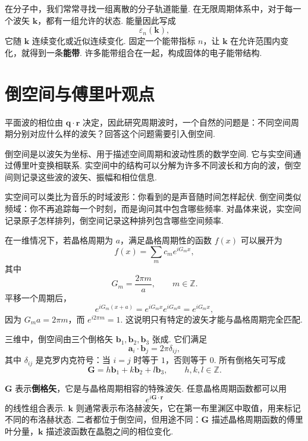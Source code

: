 \documentclass[UTF8,11pt,a4paper,openany]{ctexbook}
\newcommand{\term}[1]{\textbf{#1}}
\begin{document}
在分子中，我们常常寻找一组离散的分子轨道能量. 在无限周期体系中，对于每一个波矢 $\mathbf k$，都有一组允许的状态. 能量因此写成
\[
\varepsilon_n(\mathbf k),
\]
它随 $\mathbf k$ 连续变化或近似连续变化. 固定一个能带指标 $n$，让 $\mathbf k$ 在允许范围内变化，就得到一条\term{能带}. 许多能带组合在一起，构成固体的电子能带结构. 

\section{倒空间与傅里叶观点}

平面波的相位由 $\mathbf q\cdot\mathbf r$ 决定，因此研究周期波时，一个自然的问题是：不同空间周期分别对应什么样的波矢？回答这个问题需要引入倒空间. 

\begin{definitionbox}
倒空间是以波矢为坐标、用于描述空间周期和波动性质的数学空间. 它与实空间通过傅里叶变换相联系. 实空间中的结构可以分解为许多不同波长和方向的波，倒空间则记录这些波的波矢、振幅和相位信息. 
\end{definitionbox}

\begin{analogybox}
实空间可以类比为音乐的时域波形：你看到的是声音随时间怎样起伏. 倒空间类似频域：你不再追踪每一个时刻，而是询问其中包含哪些频率. 对晶体来说，实空间记录原子怎样排列，倒空间记录这种排列包含哪些空间频率. 
\end{analogybox}

在一维情况下，若晶格周期为 $a$，满足晶格周期性的函数 $f(x)$ 可以展开为
\[
f(x)=\sum_m c_m e^{iG_m x},
\]
其中
\[
G_m=\frac{2\pi m}{a},\qquad m\in\mathbb Z.
\]
平移一个周期后，
\[
e^{iG_m(x+a)}
=
e^{iG_mx}e^{iG_ma}
=
e^{iG_mx},
\]
因为 $G_ma=2\pi m$，而 $e^{i2\pi m}=1$. 这说明只有特定的波矢才能与晶格周期完全匹配. 

三维中，倒空间由三个倒格矢 $\mathbf b_1,\mathbf b_2,\mathbf b_3$ 张成. 它们满足
\[
\mathbf a_i\cdot\mathbf b_j=2\pi\delta_{ij},
\]
其中 $\delta_{ij}$ 是克罗内克符号：当 $i=j$ 时等于 $1$，否则等于 $0$. 所有倒格矢可写成
\[
\mathbf G=h\mathbf b_1+k\mathbf b_2+l\mathbf b_3,
\qquad h,k,l\in\mathbb Z.
\]

\begin{notationbox}
$\mathbf G$ 表示\term{倒格矢}，它是与晶格周期相容的特殊波矢. 任意晶格周期函数都可以用
\[
e^{i\mathbf G\cdot\mathbf r}
\]
的线性组合表示. $\mathbf k$ 则通常表示布洛赫波矢，它在第一布里渊区中取值，用来标记不同的布洛赫状态. 二者都位于倒空间，但用途不同：$\mathbf G$ 描述晶格周期函数的傅里叶分量，$\mathbf k$ 描述波函数在晶胞之间的相位变化. 
\end{notationbox}
\end{document}
